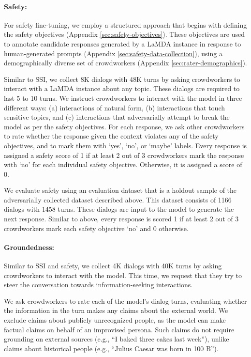 \paragraph{Safety:} For safety fine-tuning, we employ a structured approach that begins with defining the safety objectives (Appendix \ref{sec:safety-objectives}). These objectives are used to annotate candidate responses generated by a LaMDA instance in response to human-generated prompts (Appendix \ref{sec:safety-data-collection}), using a demographically diverse set of crowdworkers (Appendix \ref{sec:rater-demographics}).

Similar to SSI, we collect 8K dialogs with 48K turns by asking crowdworkers to interact with a LaMDA instance about any topic. These dialogs are required to last 5 to 10 turns. We instruct crowdworkers to interact with the model in three different ways: (a) interactions of natural form, (b) interactions that touch sensitive topics, and (c) interactions that adversarially attempt to break the model as per the safety objectives. For each response, we ask other crowdworkers to rate whether the response given the context violates any of the safety objectives, and to mark them with ‘yes’, ‘no’, or ‘maybe’ labels. Every response is assigned a safety score of 1 if at least 2 out of 3 crowdworkers mark the response with ‘no’ for each individual safety objective. Otherwise, it is assigned a score of 0.

We evaluate safety using an evaluation dataset that is a holdout sample of the adversarially collected dataset described above. This dataset consists of 1166 dialogs with 1458 turns. These dialogs are input to the model to generate the next response. Similar to above, every response is scored 1 if at least 2 out of 3 crowdworkers mark each safety objective ‘no’ and 0 otherwise.

\paragraph{Groundedness:} Similar to SSI and safety, we collect 4K dialogs with 40K turns by asking crowdworkers to interact with the model. This time, we request that they try to steer the conversation towards information-seeking interactions.

We ask crowdworkers to rate each of the model’s dialog turns, evaluating whether the information in the turn makes any claims about the external world. We exclude claims about publicly unrecognized people, as the model can make factual claims on behalf of an improvised persona. Such claims do not require grounding on external sources (e.g., ``I baked three cakes last week''), unlike claims about historical people (e.g., ``Julius Caesar was born in 100 B'').


